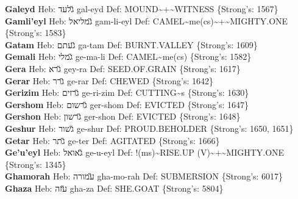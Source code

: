 {\textbf{Galeyd} Heb: {\large\H גלעד} gal-eyd Def: MOUND\textasciitilde{}+\textasciitilde{}WITNESS \{Strong's: 1567\}\hfill{}\\

\textbf{Gamli'eyl} Heb: {\large\H גמליאל} gam-li-eyl Def: CAMEL\textasciitilde{}me(cs)\textasciitilde{}+\textasciitilde{}MIGHTY.ONE \{Strong's: 1583\}\hfill{}\\

\textbf{Gatam} Heb: {\large\H געתם} ga-tam Def: BURNT.VALLEY \{Strong's: 1609\}\hfill{}\\

\textbf{Gemali} Heb: {\large\H גמלי} ge-ma-li Def: CAMEL\textasciitilde{}me(cs) \{Strong's: 1582\}\hfill{}\\

\textbf{Gera} Heb: {\large\H גרא} gey-ra Def: SEED.OF.GRAIN \{Strong's: 1617\}\hfill{}\\

\textbf{Gerar} Heb: {\large\H גרר} ge-rar Def: CHEWED \{Strong's: 1642\}\hfill{}\\

\textbf{Gerizim} Heb: {\large\H גרזים} ge-ri-zim Def: CUTTING\textasciitilde{}s \{Strong's: 1630\}\hfill{}\\

\textbf{Gershom} Heb: {\large\H גרשום} ger-shom Def: EVICTED \{Strong's: 1647\}\hfill{}\\

\textbf{Gershon} Heb: {\large\H גרשון} ger-shon Def: EVICTED \{Strong's: 1648\}\hfill{}\\

\textbf{Geshur} Heb: {\large\H גשור} ge-shur Def: PROUD.BEHOLDER \{Strong's: 1650, 1651\}\hfill{}\\

\textbf{Getar} Heb: {\large\H גתר} ge-ter Def: AGITATED \{Strong's: 1666\}\hfill{}\\

\textbf{Ge'u'eyl} Heb: {\large\H גאואל} ge-u-eyl Def: !(ms)\textasciitilde{}RISE.UP (V)\textasciitilde{}+\textasciitilde{}MIGHTY.ONE \{Strong's: 1345\}\hfill{}\\

\textbf{Ghamorah} Heb: {\large\H עמורה} gha-mo-rah Def: SUBMERSION \{Strong's: 6017\}\hfill{}\\

\textbf{Ghaza} Heb: {\large\H עזה} gha-za Def: SHE.GOAT \{Strong's: 5804\}\hfill{}\\

}
